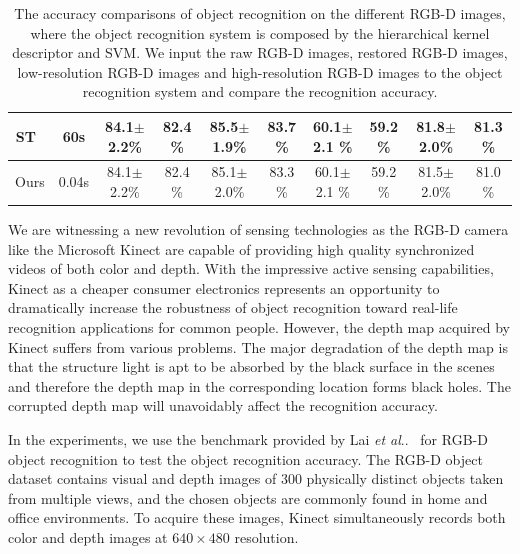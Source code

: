 \documentclass[preprint,10pt,5p,times,twocolumn]{elsarticle}
\makeatletter
\DeclareRobustCommand\onedot{\futurelet\@let@token\@onedot}
\def\@onedot{\ifx\@let@token.\else.\null\fi\xspace}
\def\etal{\emph{et al}\onedot}
\makeatother
\begin{document}
\begin{table}[t]
\begin{tabular}{|c|c|c|c|c|c|c|c|c|c|}
ST~\cite{Choi_TIP_2014}                &   60s    &       84.1$\pm$2.2\%    &       82.4 \%         &  85.5$\pm$1.9\%            &     83.7 \%       &     60.1$\pm$2.1 \% &  59.2 \%         &         81.8$\pm$2.0\%    &       81.3 \%           \\ \hline
Ours              &     0.04s  &   84.1$\pm$2.2\%    &       82.4 \%        &       85.1$\pm$2.0\%            &     83.3 \%       &     60.1$\pm$2.1 \% &  59.2 \%       &    81.5$\pm$2.0\%            &     81.0 \%       \\ \hline
\end{tabular}
\caption{The accuracy comparisons of object recognition on the different RGB-D images, where the object recognition system is composed by the hierarchical kernel descriptor and SVM. We input the raw RGB-D images, restored RGB-D images, low-resolution RGB-D images and high-resolution RGB-D images to the object recognition system and compare the recognition accuracy.}
\label{tab:recognition}
\end{table}

We are witnessing a new revolution of sensing technologies as the RGB-D camera like the Microsoft Kinect are capable of providing high quality synchronized videos of both color and depth. With the impressive active sensing capabilities, Kinect as a cheaper consumer electronics represents an opportunity to dramatically increase the robustness of object recognition toward real-life recognition applications for common people. However, the depth map acquired by Kinect suffers from various problems. The major degradation of the depth map is that the structure light is apt to be absorbed by the black surface in the scenes and therefore the depth map in the corresponding location forms black holes. The corrupted depth map will unavoidably  affect the recognition accuracy.

In the experiments, we use the benchmark provided by Lai \etal~\cite{Lai_ICRA_2011} for RGB-D object
recognition to test the object recognition accuracy. The RGB-D object dataset contains visual and depth images of 300 physically distinct objects taken from multiple views, and the chosen objects are commonly found in home and office environments. To acquire these images, Kinect simultaneously records both color and depth images at $640 \times 480$ resolution.
\end{document}
